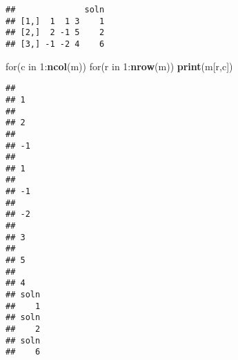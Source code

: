 \documentclass[]{article}
\newenvironment{Shaded}{\begin{snugshade}}{\end{snugshade}}
\newcommand{\KeywordTok}[1]{\textcolor[rgb]{0.13,0.29,0.53}{\textbf{{#1}}}}
\newcommand{\DecValTok}[1]{\textcolor[rgb]{0.00,0.00,0.81}{{#1}}}
\newcommand{\NormalTok}[1]{{#1}}
\begin{document}
\begin{verbatim}
##              soln
## [1,]  1  1 3    1
## [2,]  2 -1 5    2
## [3,] -1 -2 4    6
\end{verbatim}

\begin{Shaded}
\begin{Highlighting}[]
\NormalTok{for(c in }\DecValTok{1}\NormalTok{:}\KeywordTok{ncol}\NormalTok{(m))}
  \NormalTok{for(r in }\DecValTok{1}\NormalTok{:}\KeywordTok{nrow}\NormalTok{(m))}
    \KeywordTok{print}\NormalTok{(m[r,c])}
\end{Highlighting}
\end{Shaded}

\begin{verbatim}
##   
## 1 
##   
## 2 
##    
## -1 
##   
## 1 
##    
## -1 
##    
## -2 
##   
## 3 
##   
## 5 
##   
## 4 
## soln 
##    1 
## soln 
##    2 
## soln 
##    6
\end{verbatim}
\end{document}
